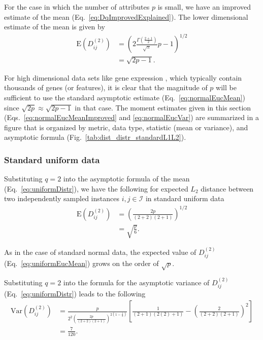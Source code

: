 \documentclass[10pt,letterpaper]{article}
\begin{document}
For the case in which the number of attributes $p$ is small, we have an improved estimate of the mean (Eq.~\ref{eq:DqImprovedExplained}). The lower dimensional estimate of the mean is given by
%
\begin{equation}\label{eq:normalEucMeanImproved}
\begin{aligned}
\text{E}\left(D^{(2)}_{ij}\right) &= \left(2\frac{\Gamma\left(\frac{2 + 1}{2}\right)}{\sqrt{\pi}}p - 1\right)^{1/2} \\
&= \sqrt{2p - 1}.
\end{aligned}
\end{equation}

For high dimensional data sets like gene expression \cite{brazma2000,wang2018}, which typically contain thousands of genes (or features), it is clear that the magnitude of $p$ will be sufficient to use the standard asymptotic estimate (Eq.~\ref{eq:normalEucMean}) since $\sqrt{2p} \approx \sqrt{2p - 1}$ in that case. The moment estimates given in this section (Eqs.~\ref{eq:normalEucMeanImproved} and \ref{eq:normalEucVar}) are summarized in a figure that is organized by metric, data type, statistic (mean or variance), and asymptotic formula (Fig.~\ref{tab:dist_distr_standardL1L2}).

\subsubsection{Standard uniform data}

Substituting $q=2$ into the asymptotic formula of the mean (Eq.~\ref{eq:uniformDistr}), we have the following for expected $L_2$ distance between two independently sampled instances $i,j \in \mathcal{I}$ in standard uniform data
%
\begin{equation}\label{eq:uniformEucMean}
\begin{aligned}
\text{E}\left(D^{(2)}_{ij}\right) &= \left(\frac{2p}{(2+2)(2+1)}\right)^{1/2} \\
&= \sqrt{\frac{p}{6}}.
\end{aligned}
\end{equation}

As in the case of standard normal data, the expected value of $D^{(2)}_{ij}$ (Eq.~\ref{eq:uniformEucMean}) grows on the order of $\sqrt{p}$. 

Substituting $q=2$ into the formula for the asymptotic variance of $D^{(2)}_{ij}$ (Eq.~\ref{eq:uniformDistr}) leads to the following
%
\begin{equation}\label{eq:uniformEucVar}
\begin{aligned}
\text{Var}\left(D^{(2)}_{ij}\right) &= \frac{p}{2^2\left(\frac{2p}{(2 + 2)(2 + 1)}\right)^{2\left(1 - \frac{1}{2}\right)}}\left[\frac{1}{(2 + 1)(2(2) + 1)} - \left(\frac{2}{(2 + 2)(2 + 1)}\right)^2\right] \\
&= \frac{7}{120}.
\end{aligned}
\end{equation}
\end{document}
